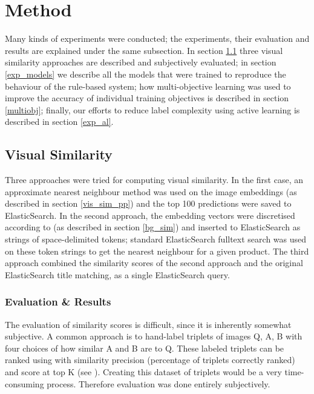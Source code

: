 \chapter{Method}
\label{meth}
\label{exp}


\hfill \break \noindent

Many kinds of experiments were conducted; the experiments, their evaluation and results are explained under the same subsection.
In section \ref{exp_sim} three visual similarity approaches are described and subjectively evaluated;
in section \ref{exp_models} we describe all the models that were trained to reproduce the behaviour of the rule-based system;
how multi-objective learning was used to improve the accuracy of individual training objectives is described in section \ref{multiobj};
finally, our efforts to reduce label complexity using active learning is described in section \ref{exp_al}.


\section{Visual Similarity}
\label{exp_sim}

Three approaches were tried for computing visual similarity.
In the first case, an approximate nearest neighbour method \cite{nmslib} was used on the image embeddings (as described in section \ref{vis_sim_pp}) and the top 100 predictions were saved to ElasticSearch.
In the second approach, the embedding vectors were discretised according to \cite{vec_fulltext} (as described in section \ref{bg_sim}) and inserted to ElasticSearch as strings of space-delimited tokens; standard ElasticSearch fulltext search was used on these token strings to get the nearest neighbour for a given product.
The third approach combined the similarity scores of the second approach and the original ElasticSearch title matching, as a single ElasticSearch query.

\subsection{Evaluation \& Results}

The evaluation of similarity scores is difficult, since it is inherently somewhat subjective.
A common approach is to hand-label triplets of images Q, A, B with four choices of how similar A and B are to Q.
These labeled triplets can be ranked using with similarity precision (percentage of triplets correctly ranked) and score at top K (see \cite{imgsimfineg}).
Creating this dataset of triplets would be a very time-consuming process. Therefore evaluation was done entirely subjectively.

